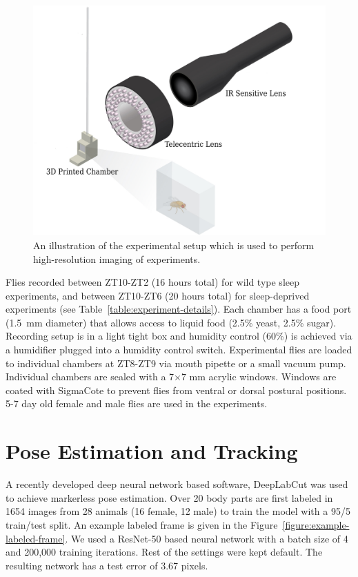 \begin{figure}[htb!]
	\centering
	\includegraphics[width=0.8\linewidth]{figures/ExperimentalSetup.pdf}
	\caption[An illustration of the experimental setup which is used to perform high-resolution imaging of experiments.]{An illustration of the experimental setup which is used to perform high-resolution imaging of experiments.\label{figure:experiment-setup}}
\end{figure}

Flies recorded between ZT10-ZT2 (16 hours total) for wild type sleep experiments, and between ZT10-ZT6 (20 hours total) for sleep-deprived experiments (see Table~\ref{table:experiment-details}).
Each chamber has a food port (1.5 mm diameter) that allows access to liquid food (2.5\% yeast, 2.5\% sugar).
Recording setup is in a light tight box and humidity control (60\%) is achieved via a humidifier plugged into a humidity control switch. Experimental flies are loaded to individual chambers at ZT8-ZT9 via mouth pipette or a small vacuum pump.
Individual chambers are sealed with a 7×7 mm acrylic windows.
Windows are coated with SigmaCote to prevent flies from ventral or dorsal postural positions. 5-7 day old female and male flies are used in the experiments.

\section{Pose Estimation and Tracking}
A recently developed deep neural network based software, DeepLabCut \citep{mathis_deeplabcut_2018} was used to achieve markerless pose estimation.
Over 20 body parts are first labeled in 1654 images from 28 animals (16 female, 12 male) to train the model with a 95/5 train/test split. An example labeled frame is given in the Figure~\ref{figure:example-labeled-frame}.
We used a ResNet-50 \citep{he_deep_2016} based neural network with a batch size of 4 and 200,000 training iterations.
Rest of the settings were kept default.
The resulting network has a test error of 3.67 pixels.

